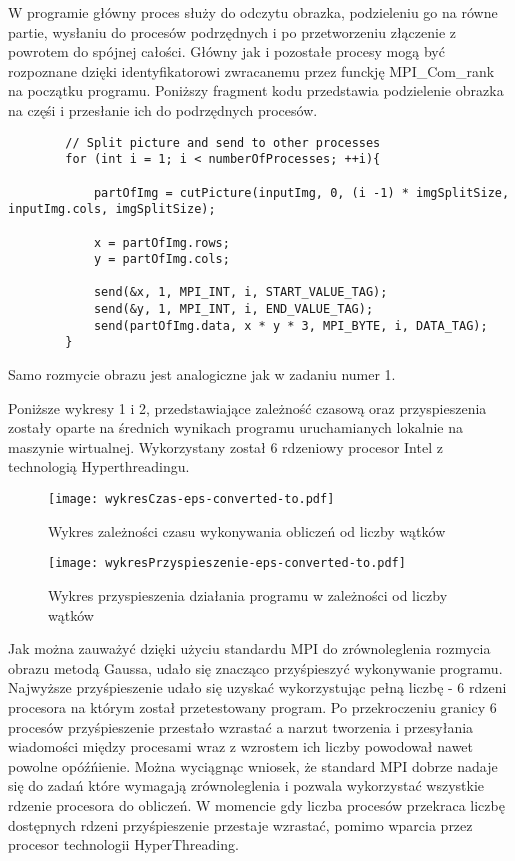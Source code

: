 \documentclass[a4paper,12pt]{article}
\begin{document}
W programie główny proces służy do odczytu obrazka, podzieleniu go na równe partie, wysłaniu do procesów podrzędnych i po przetworzeniu złączenie z powrotem do spójnej całości.
Główny jak i pozostałe procesy mogą być rozpoznane dzięki identyfikatorowi zwracanemu przez funckję MPI\_Com\_rank na początku programu. Poniższy fragment kodu przedstawia podzielenie obrazka na częśi i przesłanie ich do podrzędnych procesów.

\begin{lstlisting}
        // Split picture and send to other processes
        for (int i = 1; i < numberOfProcesses; ++i){

            partOfImg = cutPicture(inputImg, 0, (i -1) * imgSplitSize, inputImg.cols, imgSplitSize);

            x = partOfImg.rows;
            y = partOfImg.cols;
            
            send(&x, 1, MPI_INT, i, START_VALUE_TAG);
            send(&y, 1, MPI_INT, i, END_VALUE_TAG);
            send(partOfImg.data, x * y * 3, MPI_BYTE, i, DATA_TAG);
        }
\end{lstlisting}

Samo rozmycie obrazu jest analogiczne jak w zadaniu numer 1.

Poniższe wykresy 1 i 2, przedstawiające zależność czasową oraz przyspieszenia zostały oparte na średnich wynikach programu uruchamianych lokalnie na maszynie wirtualnej. Wykorzystany został 6 rdzeniowy procesor Intel z technologią Hyperthreadingu.

\begin{figure}[!ht]
	\centering
  \texttt{[image: wykresCzas-eps-converted-to.pdf]}
  \caption{Wykres zależności czasu wykonywania obliczeń od liczby wątków}
\end{figure}

\begin{figure}[!ht]
	\centering
  \texttt{[image: wykresPrzyspieszenie-eps-converted-to.pdf]}
  \caption{Wykres przyspieszenia działania programu w zależności od liczby wątków}
\end{figure}

Jak można zauważyć dzięki użyciu standardu MPI do zrównoleglenia rozmycia obrazu metodą Gaussa, udało się znacząco przyśpieszyć wykonywanie programu. Najwyższe przyśpieszenie udało się uzyskać wykorzystując pełną liczbę - 6 rdzeni procesora na którym został przetestowany program. Po przekroczeniu granicy 6 procesów przyśpieszenie przestało wzrastać a narzut tworzenia i przesyłania wiadomości między procesami wraz z wzrostem ich liczby powodował nawet powolne opóźńienie.
Można wyciągnąc wniosek, że standard MPI dobrze nadaje się do zadań które wymagają zrównoleglenia i pozwala wykorzystać wszystkie rdzenie procesora do obliczeń. W momencie gdy liczba procesów przekraca liczbę dostępnych rdzeni przyśpieszenie przestaje wzrastać, pomimo wparcia przez procesor technologii HyperThreading.
\end{document}
